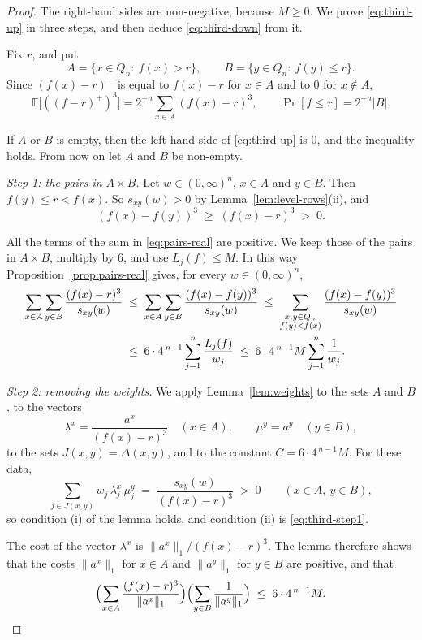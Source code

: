 \documentclass[11pt,reqno]{amsart}
\theoremstyle{definition}
\theoremstyle{remark}
\numberwithin{equation}{section}
\theoremstyle{named}
\theoremstyle{plain}
\newcommand{\E}{\mathbb{E}}
\newcommand{\norm}[1]{\lVert #1\rVert_1}
\newcommand{\abs}[1]{\lvert #1\rvert}
\begin{document}
\begin{proof}
The right-hand sides are non-negative, because $M\ge0$. We prove \eqref{eq:third-up} in three
steps, and then deduce \eqref{eq:third-down} from it.

Fix $r$, and put
\[
   A=\{x\in Q_n:\ f(x)>r\},\qquad B=\{y\in Q_n:\ f(y)\le r\}.
\]
Since $(f(x)-r)^{+}$ is equal to $f(x)-r$ for $x\in A$ and to $0$ for $x\notin A$,
\begin{equation}\label{eq:third-AB}
   \E\bigl[((f-r)^{+})^{3}\bigr]=2^{-n}\sum_{x\in A}(f(x)-r)^{3},\qquad \Pr[f\le r]=2^{-n}\abs{B}.
\end{equation}

If $A$ or $B$ is empty, then the left-hand side of \eqref{eq:third-up} is $0$, and the inequality
holds. From now on let $A$ and $B$ be non-empty.

\smallskip
\emph{Step 1: the pairs in $A\times B$.} Let $w\in(0,\infty)^{n}$, $x\in A$ and $y\in B$. Then
$f(y)\le r<f(x)$. So $s_{xy}(w)>0$ by Lemma~\ref{lem:level-rows}(ii), and
\[
   (f(x)-f(y))^{3}\;\ge\;(f(x)-r)^{3}\;>\;0 .
\]

All the terms of the sum in \eqref{eq:pairs-real} are positive. We keep those of the pairs in
$A\times B$, multiply by $6$, and use $L_j(f)\le M$. In this way
Proposition~\ref{prop:pairs-real} gives, for every $w\in(0,\infty)^{n}$,
\begin{align}
   \sum_{x\in A}\sum_{y\in B}\frac{(f(x)-r)^{3}}{s_{xy}(w)}
   &\;\le\;\sum_{x\in A}\sum_{y\in B}\frac{(f(x)-f(y))^{3}}{s_{xy}(w)}
   \;\le\;\sum_{\substack{x,y\in Q_n\\ f(y)<f(x)}}\frac{(f(x)-f(y))^{3}}{s_{xy}(w)}\notag\\
   &\;\le\;6\cdot4^{\,n-1}\sum_{j=1}^{n}\frac{L_j(f)}{w_j}
   \;\le\;6\cdot4^{\,n-1}M\sum_{j=1}^{n}\frac1{w_j}. \label{eq:third-step1}
\end{align}

\smallskip
\emph{Step 2: removing the weights.} We apply Lemma~\ref{lem:weights} to the sets $A$ and $B$, to
the vectors
\[
   \lambda^{x}=\frac{a^{x}}{(f(x)-r)^{3}}\quad(x\in A),\qquad \mu^{y}=a^{y}\quad(y\in B),
\]
to the sets $J(x,y)=\Delta(x,y)$, and to the constant $C=6\cdot4^{\,n-1}M$. For these data,
\[
   \sum_{j\in J(x,y)}w_j\,\lambda^{x}_j\,\mu^{y}_j\;=\;\frac{s_{xy}(w)}{(f(x)-r)^{3}}\;>\;0
   \qquad(x\in A,\ y\in B),
\]
so condition (i) of the lemma holds, and condition (ii) is \eqref{eq:third-step1}.

The cost of
the vector $\lambda^{x}$ is $\norm{a^{x}}/(f(x)-r)^{3}$. The lemma therefore shows that the costs
$\norm{a^{x}}$ for $x\in A$ and $\norm{a^{y}}$ for $y\in B$ are positive, and that
\begin{equation}\label{eq:third-step2}
   \Bigl(\sum_{x\in A}\frac{(f(x)-r)^{3}}{\norm{a^{x}}}\Bigr)
   \Bigl(\sum_{y\in B}\frac1{\norm{a^{y}}}\Bigr)\;\le\;6\cdot4^{\,n-1}M .
\end{equation}


\end{proof}
\end{document}
